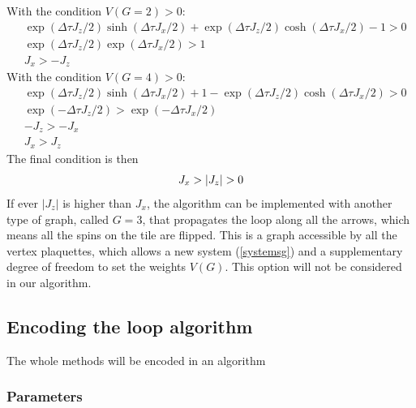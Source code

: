 \documentclass[a4paper,12pt,twoside]{article}
\begin{document}
	With the condition $V(G=2) > 0$:
	\begin{equation}
		\begin{split}
		&\exp(\Delta \tau J_{z}/2)\sinh(\Delta\tau J_{x}/2) + \exp(\Delta \tau J_{z}/2)\cosh(\Delta\tau J_{x}/2) - 1  > 0 \\
		&\exp(\Delta \tau J_{z}/2)\exp(\Delta\tau J_{x}/2)  > 1\\
		&J_{x} > - J_{z}
		\end{split}
	\end{equation}
	With the condition $V(G=4) > 0$:
	\begin{equation}
		\begin{split}
		&\exp(\Delta \tau J_{z}/2)\sinh(\Delta\tau J_{x}/2) + 1 - \exp(\Delta \tau J_{z}/2)\cosh(\Delta\tau J_{x}/2) > 0 \\
		&\exp(- \Delta \tau J_{z}/2)  > \exp(- \Delta\tau J_{x}/2)\\
		&- J_{z} > - J_{x}\\
		& J_{x} > J_{z}
		\end{split}
	\end{equation}
	The final condition is then
	\begin{equation}
		\centering
		J_{x} > |J_{z}| > 0
	\end{equation}
	If ever $|J_{z}|$ is higher than $J_{x}$, the algorithm can be implemented with another type of graph, called $G = 3$, that propagates the loop along all the arrows, which means all the spins on the tile are flipped. This is a graph accessible by all the vertex plaquettes, which allows a new system (\ref{systemsg}) and a supplementary degree of freedom to set the weights $V(G)$. This option will not be considered in our algorithm.
	
	\subsection{Encoding the loop algorithm}
	The whole methods will be encoded in an algorithm
	
	\subsubsection{Parameters}
	
\end{document}
